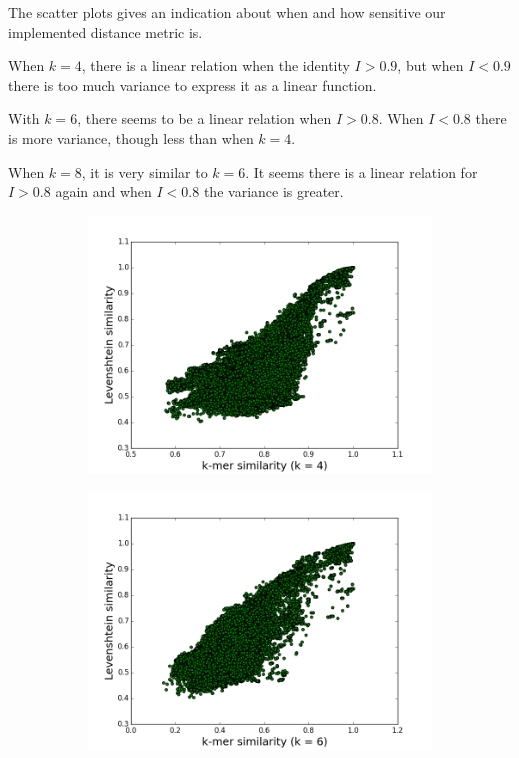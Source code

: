 The scatter plots gives an indication about when and how sensitive our
implemented distance metric is.

When $k=4$, there is a linear relation when the identity $I>0.9$, but when
$I<0.9$ there is too much variance to express it as a linear function.

With $k=6$, there seems to be a linear relation when $I>0.8$. When $I<0.8$ there
is more variance, though less than when $k=4$.

When $k=8$, it is very similar to $k=6$. It seems there is a linear relation
for $I>0.8$ again and when $I<0.8$ the variance is greater.

\begin{figure}[H]
  \begin{subfigure}[b]{0.5\textwidth}
    \includegraphics[scale=0.34]{graphics/k4.png}
  \end{subfigure}
  \begin{subfigure}[b]{0.5\textwidth}
    \includegraphics[scale=0.34]{graphics/k6.png}
  \end{subfigure}


\end{figure}
